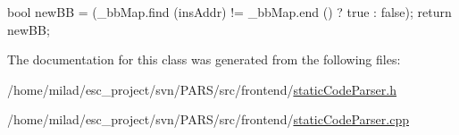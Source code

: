 \begin{DoxyCode}
                                               {
        bool newBB = (_bbMap.find (insAddr) != _bbMap.end () ? true : false);
        return newBB;
}
\end{DoxyCode}


The documentation for this class was generated from the following files:\begin{DoxyCompactItemize}
\item 
/home/milad/esc\_\-project/svn/PARS/src/frontend/\hyperlink{staticCodeParser_8h}{staticCodeParser.h}\item 
/home/milad/esc\_\-project/svn/PARS/src/frontend/\hyperlink{staticCodeParser_8cpp}{staticCodeParser.cpp}\end{DoxyCompactItemize}
